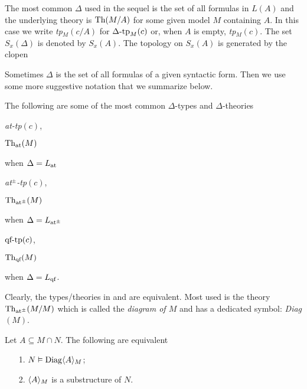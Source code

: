 \documentclass[creche.tex]{subfiles}
\begin{document}
The most common $\Delta$ used in the sequel is the set of all formulas in $L(A)$ and the underlying theory is $\textrm{Th}(M/A)$ for some given model $M$ containing $A$. In this case we write \emph{tp$_M(c/A)$} for $\Delta\mbox{-}\textrm{tp}_M(c)$ or, when $A$ is empty, \emph{tp$_M(c)$}. The set $S_x(\Delta)$ is denoted by $S_x(A)$. The topology on  $S_x(A)$ is generated by the clopen


Sometimes $\Delta$ is the set of all formulas of a given syntactic form. Then we use some more suggestive notation that we summarize below.

\begin{notation}\label{note_tipi_diagramma}
The following are some of the most common $\Delta$-types and $\Delta$-theories
\def\ceq#1#2{\parbox[b]{15ex}{#1}\parbox[b]{14ex}{\hfill #2}}


\ceq{\hfill\emph{\textrm{at-tp}$(c)$},}{\emph{$\textrm{Th}_{\textrm{\scriptsize at}}(M)$\/}}\qquad when $\Delta=L_{\tiny\rm at}\hskip-.3ex$

\ceq{\hfill\emph{\textrm{at$^\pm$-tp}$(c)$},}{\emph{$\textrm{Th}_{\textrm{\scriptsize at}^\pm}(M)$\/}}\qquad when $\Delta=L_{{\tiny\rm at^\pm}}\hskip-.3ex$

\ceq{\hfill\emph{$\textrm{qf\mbox{-}tp}(c)$},}{\emph{$\textrm{Th}_{\textrm{\scriptsize qf}}(M)$\/}}\qquad when $\Delta=L_{\rm qf}$.

Clearly, the types/theories in  and  are equivalent. Most used is the theory $\textrm{Th}_{\textrm{\scriptsize at}^\pm}(M/M)$ which is called the \emph{diagram of $M$\/} and has a dedicated symbol: \emph{Diag$(M)$}.\QED
\end{notation}

\begin{remark}\label{rem_diagram}
Let $A\subseteq M\cap N$. The following are equivalent
\begin{itemize}
\item[1.] $N\vDash{\rm Diag}\langle A\rangle_M$;
\item[2.] $\langle A\rangle_M$ is a substructure of $N$.\QED
\end{itemize}
\end{remark}


\end{document}
